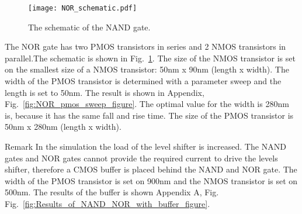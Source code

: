 \begin{figure}[h]
\texttt{[image: NOR\_schematic.pdf]}
\caption{The schematic of the NAND gate.}
\label{fig:NOR_schematic_figure}
\end{figure}

The NOR gate has two PMOS transistors in series and 2 NMOS transistors in parallel.The schematic is shown in Fig.~\ref{fig:NOR_schematic_figure}. The size of the NMOS transistor is set on the smallest size of a NMOS transistor: 50nm x 90nm (length x width). The width of the PMOS transistor is determined with a parameter sweep and the length is set to 50nm. The result is shown in Appendix, Fig.~\ref{fig:NOR_pmos_sweep_figure}. The optimal value for the width is 280nm is, because it has the same fall and rise time. The size of the PMOS transistor is 50nm x 280nm (length x width).

Remark
In the simulation the load of the level shifter is increased. The NAND gates and NOR gates cannot provide the required current to drive the levels shifter, therefore a CMOS buffer is placed behind the NAND and NOR gate. The width of the PMOS transistor is set on 900nm and the NMOS transistor is set on 500nm. The results of the buffer is shown Appendix A, Fig. Fig.~\ref{fig:Results_of_NAND_NOR_with_buffer_figure}.

